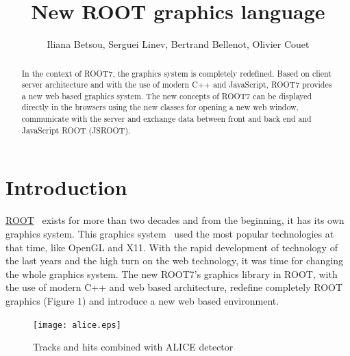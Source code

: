 \documentclass[a4paper]{jpconf}
\begin{document}
\title{New ROOT graphics language}

\author{Iliana Betsou, Serguei Linev, Bertrand Bellenot, Olivier Couet}

\address{Production Editor, \jpcs, \iopp, Dirac House, Temple Back, Bristol BS1~6BE, UK}


\begin{abstract}
In the context of ROOT7, the graphics system is completely redefined. Based on client server architecture and with the use of modern C++ and JavaScript, ROOT7 provides a new web based graphics system. The new concepts of ROOT7 can be displayed directly in the browsers using the new classes for opening a new web window, communicate with the server and exchange data between front and back end and JavaScript ROOT (JSROOT).
\end{abstract}

\section{Introduction}
\href{https://root.cern.ch/}{ROOT}~\cite{root} exists for more than two decades and from the beginning, it has its own graphics system. This graphics system~\cite{Antcheva:2011zz} used the most popular technologies at that time, like OpenGL and X11. With the rapid development of technology of the last years and the high turn on the web technology, it was time for changing the whole graphics system. The new ROOT7's graphics library in ROOT, with the use of modern C++ and web based architecture, redefine completely ROOT graphics (Figure 1) and introduce a new web based environment.
\\
\begin{figure}[h]
  \begin{center}
    \texttt{[image: alice.eps]}\hspace{2pc}%
  \end{center}
\centering
\begin{minipage}[b]{25pc}\caption{\label{label}Tracks and hits combined with ALICE detector}
\end{minipage}
\end{figure}
\end{document}
